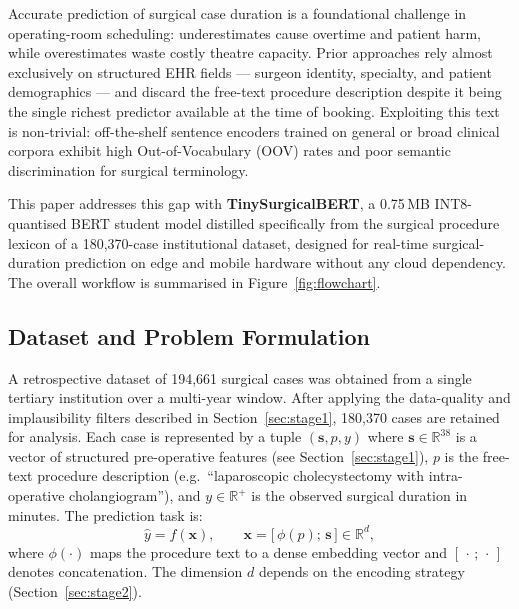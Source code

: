 
Accurate prediction of surgical case duration is a foundational challenge in operating-room scheduling: underestimates cause overtime and patient harm, while overestimates waste costly theatre capacity. Prior approaches rely almost exclusively on structured EHR fields — surgeon identity, specialty, and patient demographics — and discard the free-text procedure description despite it being the single richest predictor available at the time of booking. Exploiting this text is non-trivial: off-the-shelf sentence encoders trained on general or broad clinical corpora exhibit high Out-of-Vocabulary (OOV) rates and poor semantic discrimination for surgical terminology.

This paper addresses this gap with \textbf{TinySurgicalBERT}, a 0.75\,MB INT8-quantised BERT student model distilled specifically from the surgical procedure lexicon of a 180,370-case institutional dataset, designed for real-time surgical-duration prediction on edge and mobile hardware without any cloud dependency. The overall workflow is summarised in Figure~\ref{fig:flowchart}.

\subsection{Dataset and Problem Formulation}
\label{sec:dataset}

A retrospective dataset of 194{,}661 surgical cases was obtained from a single tertiary institution over a multi-year window. After applying the data-quality and implausibility filters described in Section~\ref{sec:stage1}, 180{,}370 cases are retained for analysis. Each case is represented by a tuple $(\mathbf{s}, p, y)$ where $\mathbf{s} \in \mathbb{R}^{38}$ is a vector of structured pre-operative features (see Section~\ref{sec:stage1}), $p$ is the free-text procedure description (e.g.\ ``laparoscopic cholecystectomy with intra-operative cholangiogram''), and $y \in \mathbb{R}^{+}$ is the observed surgical duration in minutes. The prediction task is:
\begin{equation}
  \hat{y} = f\!\left(\mathbf{x}\right),
  \qquad
  \mathbf{x} = \bigl[\,\phi(p);\,\mathbf{s}\,\bigr] \in \mathbb{R}^{d},
  \label{eq:task}
\end{equation}
where $\phi(\cdot)$ maps the procedure text to a dense embedding vector and $[\,\cdot\,;\,\cdot\,]$ denotes concatenation. The dimension $d$ depends on the encoding strategy (Section~\ref{sec:stage2}).

